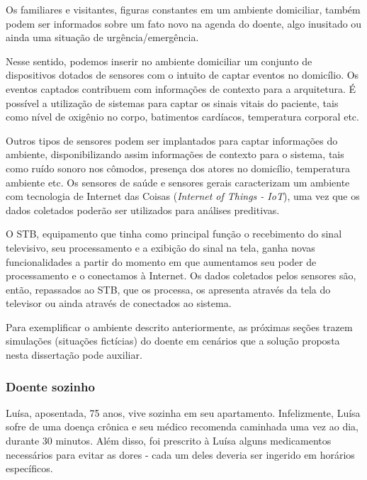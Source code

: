 Os familiares e visitantes, figuras constantes em um ambiente domiciliar, também
podem ser informados sobre um fato novo na agenda do doente, algo inusitado ou 
ainda uma situação de urgência/emergência.

Nesse sentido, podemos inserir no ambiente domiciliar um conjunto de
dispositivos dotados de sensores com o intuito de captar eventos no domicílio. 
Os eventos captados contribuem com informações de contexto para a arquitetura.
É possível a utilização de sistemas para captar os sinais vitais do paciente, tais
como nível de oxigênio no corpo, batimentos cardíacos, temperatura corporal etc.

Outros tipos de sensores podem ser implantados para captar informações do
ambiente, disponibilizando assim informações de contexto para o sistema,  tais
como ruído sonoro nos cômodos, presença dos atores no domicílio, temperatura
ambiente etc. Os sensores de saúde e sensores gerais caracterizam um ambiente 
com tecnologia de Internet das Coisas (\textit{Internet of Things  - IoT}), uma
vez que os dados coletados poderão ser utilizados para análises preditivas.

O STB, equipamento que tinha como principal função o recebimento do sinal
televisivo, seu processamento e a exibição do sinal na tela, ganha novas
funcionalidades a partir do momento em que aumentamos seu  poder de
processamento e o conectamos à Internet. Os dados coletados pelos sensores são,
então, repassados ao STB, que os processa, os apresenta através da tela do
televisor ou ainda através de \smartphones[] conectados ao sistema.


Para exemplificar o ambiente descrito anteriormente, as próximas seções
trazem simulações (situações fictícias) do doente em cenários que a solução
proposta nesta dissertação pode auxiliar.
\label{subsubsec:simulacoes-A}

\subsubsection{Doente sozinho}

Luísa, aposentada, 75 anos, vive sozinha em seu apartamento. Infelizmente,
Luísa sofre de uma doença crônica e seu médico recomenda caminhada uma vez ao
dia, durante 30 minutos.  Além disso, foi prescrito à Luísa alguns medicamentos
necessários para evitar as dores - cada um deles deveria ser ingerido em
horários específicos.

